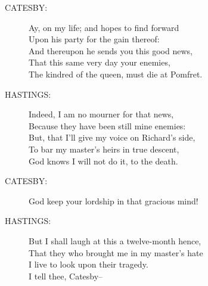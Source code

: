 \documentclass{article}
\begin{document}
\begin{description}
\item[CATESBY:] 
\hspace{1pt}Ay, on my life; and hopes to find forward\\
\hspace{1pt}Upon his party for the gain thereof:\\
\hspace{1pt}And thereupon he sends you this good news,\\
\hspace{1pt}That this same very day your enemies,\\
\hspace{1pt}The kindred of the queen, must die at Pomfret.\\
\end{description}
\begin{description}
\item[HASTINGS:] 
\hspace{1pt}Indeed, I am no mourner for that news,\\
\hspace{1pt}Because they have been still mine enemies:\\
\hspace{1pt}But, that I'll give my voice on Richard's side,\\
\hspace{1pt}To bar my master's heirs in true descent,\\
\hspace{1pt}God knows I will not do it, to the death.\\
\end{description}
\begin{description}
\item[CATESBY:] 
\hspace{1pt}God keep your lordship in that gracious mind!\\
\end{description}
\begin{description}
\item[HASTINGS:] 
\hspace{1pt}But I shall laugh at this a twelve-month hence,\\
\hspace{1pt}That they who brought me in my master's hate\\
\hspace{1pt}I live to look upon their tragedy.\\
\hspace{1pt}I tell thee, Catesby--\\
\end{description}
\end{document}
